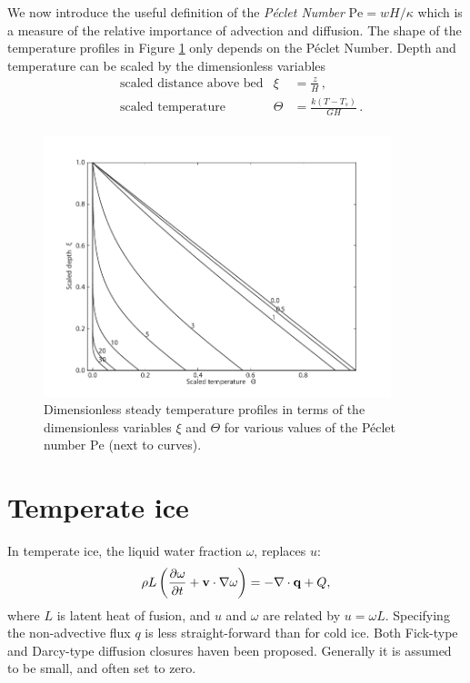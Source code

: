 \documentclass[parskip=half]{scrartcl}
\begin{document}
We now introduce the useful definition of the \emph{P{\'e}clet Number}
$\text{Pe} = w H/\kappa$ which is a measure of the relative importance
of advection and diffusion.  The shape of the temperature profiles in
Figure \ref{fig:advection-diffusion} only depends on the P{\'e}clet
Number.  Depth and temperature can be scaled by the dimensionless
variables
%
\begin{align*} &\text{scaled distance above bed} & \xi &=
\frac{z}{H}\,,\\ &\text{scaled temperature} & \Theta &= \frac{k
(T-T_s)}{G H}\,.\\
\end{align*}
%
\begin{figure}[tbhp] \centering
 \includegraphics[width=0.9\textwidth]{figures/advection-diffusion}
  \caption{Dimensionless steady temperature profiles in terms of the
dimensionless variables $\xi$ and $\Theta$ for various values of the
P{\'e}clet number $\mathrm{Pe}$ (next to curves). }
   \label{fig:advection-diffusion}
\end{figure}


\section{Temperate ice}
\label{sec:temperate-ice}

In temperate ice, the liquid water fraction $\omega$, replaces $u$:
\begin{equation}
  \label{eq:water-content-equation} \rho L\left(\frac{\partial
\omega}{\partial t} + {\bf v}\cdot\nabla \omega\right) = -\nabla \cdot
{\bf q} + Q,
\end{equation} where $L$ is latent heat of fusion, and $u$ and
$\omega$ are related by $u=\omega L$. Specifying the non-advective
flux $q$ is less straight-forward than for cold ice. Both Fick-type
and Darcy-type diffusion closures haven been proposed. Generally it is
assumed to be small, and often set to zero.
\end{document}
